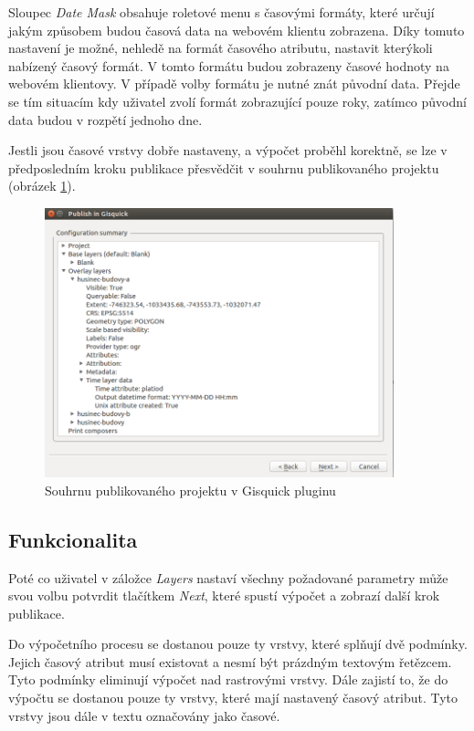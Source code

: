 Sloupec \textit{Date Mask} obsahuje roletové menu s časovými formáty,
které určují jakým způsobem budou časová data na webovém klientu
zobrazena. Díky tomuto nastavení je možné, nehledě na formát časového
atributu, nastavit kterýkoli nabízený časový formát. V tomto formátu
budou zobrazeny časové hodnoty na webovém klientovy. V případě volby
formátu je nutné znát původní data. Přejde se tím situacím kdy
uživatel zvolí formát zobrazující pouze roky, zatímco původní data
budou v rozpětí jednoho dne.

Jestli jsou časové vrstvy dobře nastaveny, a výpočet proběhl korektně,
se lze v předposledním kroku publikace přesvědčit v souhrnu publikovaného
projektu (obrázek \ref{fig:publishing-summary}).

\begin{figure}[h!]
\centering
\includegraphics[width=0.9\textwidth]{../img/project-publishing-time-summary.png}
\caption{Souhrnu publikovaného projektu v Gisquick pluginu}
\label{fig:publishing-summary}
\end{figure}

\subsection{Funkcionalita}
\label{sssec:plugin-functionality}

Poté co uživatel v záložce \textit{Layers} nastaví všechny požadované
parametry může svou volbu potvrdit tlačítkem \textit{Next}, které
spustí výpočet a zobrazí další krok publikace.

Do výpočetního procesu se dostanou pouze ty vrstvy, které splňují dvě
podmínky. Jejich časový atribut musí existovat a nesmí být prázdným
textovým řetězcem. Tyto podmínky eliminují výpočet nad rastrovými
vrstvy. Dále zajistí to, že do výpočtu se dostanou pouze ty vrstvy,
které mají nastavený časový atribut. Tyto vrstvy jsou dále v textu
označovány jako časové.

